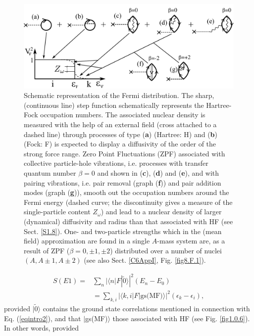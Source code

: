 \begin{figure}
\centerline {
\includegraphics*[width=12cm]{introduccion/figs/fig1_2_2}
}
\caption[Ground state correlations corrections to the mean field.]{   Schematic representation of the Fermi distribution. The sharp, (continuous line)  step function schematically represents the Hartree-Fock occupation numbers. The associated nuclear density is measured with the help of an external field (cross attached to a dashed line) through processes of type (\textbf{a}) (Hartree: H) and (\textbf{b}) (Fock: F) is expected to display a diffusivity of the order of the strong force range. Zero Point Fluctuations (ZPF) associated with collective particle-hole vibrations, i.e. processes with transfer quantum number $\beta=0$  and shown in (\textbf{c}), (\textbf{d}) and (\textbf{e}), and with pairing vibrations, i.e. pair removal (graph (\textbf{f})) and pair addition modes (graph (\textbf{g})), smooth out the occupation numbers around the Fermi energy (dashed curve; the discontinuity gives a measure of the single-particle content $Z_\omega$) and lead to a  nuclear density of larger (dynamical) diffusivity and radius than that associated with HF (see Sect. \ref{S1.8}). One- and two-particle strengths which in the (mean field) approximation are found in a single $A$-mass system are, as a result of ZPF ($\beta=0,\pm 1, \pm 2$) distributed over a number of nuclei $(A, A\pm 1, A\pm 2)$ (see also Sect. \ref{C6AppI}, Fig. \ref{fig8.F.1}).}
\label{fig1.2.2}
\end{figure}
\begin{align}\label{eqintro6}
\nonumber S(E1)=&\sum_n |\langle n|F|\tilde 0\rangle|^2(E_n-E_0)\\
&=\sum_{k,i}|\langle k,i|F|\text{gs(MF)}\rangle|^2(\epsilon_{k}-\epsilon_i),
\end{align}
provided $|\tilde 0\rangle$ contains the ground state correlations mentioned in connection with Eq. (\ref{eqintro2}), and that $|$gs(MF)$\rangle$ those associated with HF (see Fig. \ref{fig1.0.6}). In other words, provided
